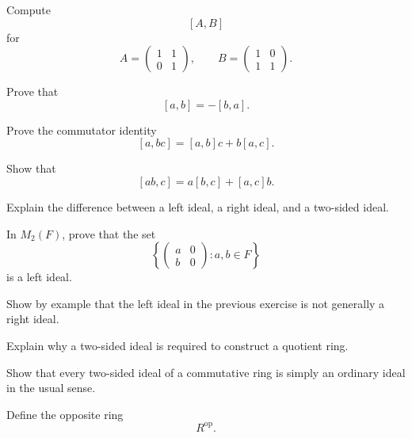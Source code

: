 \begin{exercise}[1]
Compute
\[ [A,B] \]
for
\[ A=\begin{pmatrix}1&1\\0&1\end{pmatrix},\qquad
B=\begin{pmatrix}1&0\\1&1\end{pmatrix}. \]
\end{exercise}

\begin{exercise}[1]
Prove that
\[ [a,b]=-[b,a]. \]
\end{exercise}

\begin{exercise}[2]
Prove the commutator identity
\[ [a,bc]=[a,b]c+b[a,c]. \]
\end{exercise}

\begin{exercise}[2]
Show that
\[ [ab,c]=a[b,c]+[a,c]b. \]
\end{exercise}

\begin{exercise}[1]
Explain the difference between a left ideal, a right ideal, and a two-sided
ideal.
\end{exercise}

\begin{exercise}[2]
In \(M_2(F)\), prove that the set
\[ \left\{
\begin{pmatrix}
a&0\\
b&0
\end{pmatrix}:a,b\in F
\right\} \]
is a left ideal.
\end{exercise}

\begin{exercise}[2]
Show by example that the left ideal in the previous exercise is not generally
a right ideal.
\end{exercise}

\begin{exercise}[1]
Explain why a two-sided ideal is required to construct a quotient ring.
\end{exercise}

\begin{exercise}[2]
Show that every two-sided ideal of a commutative ring is simply an ordinary
ideal in the usual sense.
\end{exercise}

\begin{exercise}[1]
Define the opposite ring
\[ R^{\mathrm{op}}. \]
\end{exercise}

